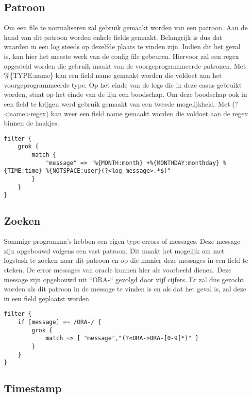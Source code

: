 \subsection{Patroon}
\label{subsec:patroon}

Om een file te normaliseren zal gebruik gemaakt worden van een patroon. Aan de hand van dit patroon worden enkele fields gemaakt. Belangrijk is dus dat waarden in een log steeds op dezelfde plaats te vinden zijn.
Indien dit het geval is, kan hier het meeste werk van de config file gebeuren. Hiervoor zal een regex opgesteld worden die gebruik maakt van de voorgeprogrammeerde patronen. 
Met \%\{TYPE:name\} kan een field name gemaakt worden die voldoet aan het voorgeprogrammeerde type. Op het einde van de logs die in deze casus gebruikt worden, staat op het einde van de lijn een boodschap.
Om deze boodschap ook in een field te krijgen werd gebruik gemaakt van een tweede mogelijkheid. Met (?<name>regex) kan weer een field name gemaakt worden die voldoet aan de regex binnen de haakjes.

\lstset{escapechar=@,style=customc}  
\begin{lstlisting}[frame=single]  
filter {
	grok {
		match {
			"message" => "%{MONTH:month} +%{MONTHDAY:monthday} %{TIME:time} %{NOTSPACE:user}(?<log_message>.*$)"	 
		}
	}
}
\end{lstlisting}

\subsection{Zoeken}
\label{subsec:zoeken}

Sommige programma’s hebben een eigen type errors of messages. Deze message zijn opgebouwd volgens een vast patroon. Dit maakt het mogelijk om met logstash te zoeken naar dit patroon en op die manier deze messages in een field te steken. De error messages van oracle kunnen hier als voorbeeld dienen. Deze message zijn opgebouwd uit “ORA-“ gevolgd door vijf cijfers. Er zal dus gezocht worden als dit patroon in de message te vinden is en als dat het geval is, zal deze in een field geplaatst worden.

\lstset{escapechar=@,style=customc}  
\begin{lstlisting}[frame=single]  
filter {
	if [message] =~ /ORA-/ {
		grok {
			match => [ "message","(?<ORA->ORA-[0-9]*)" ]
		}  
	}
}
\end{lstlisting}

\subsection{Timestamp}
\label{subsec:timestamp}


